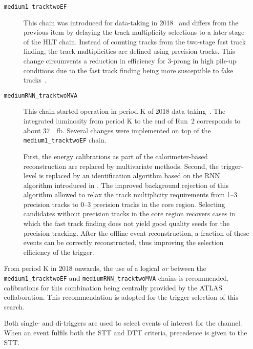 \begin{description}
\item[\texttt{medium1\_tracktwoEF}]
  This chain was introduced for data-taking in 2018~\cite{ATL-DAQ-PUB-2019-001}
  and differs from the previous item by delaying the track multiplicity
  selections to a later stage of the HLT chain. Instead of counting tracks from
  the two-stage fast track finding, the track multiplicities are defined using
  precision tracks. This change circumvents a reduction in efficiency for
  3-prong \tauhadvis in high pile-up conditions due to the fast track finding
  being more susceptible to fake tracks~\cite{ATL-DAQ-PUB-2019-001}.

\item[\texttt{mediumRNN\_tracktwoMVA}] This chain started operation in period K
  of 2018 data-taking~\cite{ATL-DAQ-PUB-2019-001}. The integrated luminosity
  from period K to the end of Run~2 corresponds to about
  \SI{37}{\per\femto\barn}. Several changes were implemented on top of the
  \texttt{medium1\_tracktwoEF} chain.

  First, the \tauhadvis energy calibrations as part of the calorimeter-based
  \tauhadvis reconstruction are replaced by multivariate methods. Second, the
  trigger-level \tauid is replaced by an identification algorithm based on the
  RNN \tauid algorithm introduced in . The improved background
  rejection of this algorithm allowed to relax the track multiplicity
  requirements from 1--3 precision tracks to 0--3 precision tracks in the core
  region. Selecting \tauhadvis candidates without precision tracks in the core
  region recovers cases in which the fast track finding does not yield good
  quality seeds for the precision tracking. After the offline event
  reconstruction, a fraction of these events can be correctly reconstructed,
  thus improving the selection efficiency of the trigger.
\end{description}
From period K in 2018 onwards, the use of a logical \emph{or} between
the \texttt{medium1\_tracktwoEF} and \texttt{mediumRNN\_tracktwoMVA}
chains is recommended, calibrations for this combination being
centrally provided by the ATLAS collaboration. This recommendation is
adopted for the trigger selection of this search.

Both single- and di-\tauhadvis triggers are used to select events of
interest for the \hadhad channel. When an event fulfils both the STT
and DTT criteria, precedence is given to the STT.

